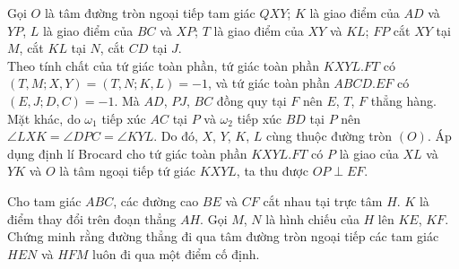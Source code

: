     \begin{solution}
        Gọi \(O\) là tâm đường tròn ngoại tiếp tam giác \(QXY\); \(K\) là giao điểm của \(AD\) và \(YP\), \(L\) là giao điểm của \(BC\) và \(XP\); \(T\) là giao điểm của \(XY\) và \(KL\); \(FP\) cắt \(XY\) tại \(M\), cắt \(KL\) tại \(N\), cắt \(CD\) tại \(J\).\\
        Theo tính chất của tứ giác toàn phần, tứ giác toàn phần \(KXYL.FT\) có \((T,M;X,Y) = (T,N;K,L) = -1\), và tứ giác toàn phần \(ABCD.EF\) có \((E,J;D,C) = -1\). Mà \(AD\), \(PJ\), \(BC\) đồng quy tại \(F\) nên \(E\), \(T\), \(F\) thẳng hàng.\\
        Mặt khác, do \(\omega_1\) tiếp xúc \(AC\) tại \(P\) và \(\omega_2\) tiếp xúc \(BD\) tại \(P\) nên \(\angle LXK = \angle DPC = \angle KYL\). Do đó, \(X\), \(Y\), \(K\), \(L\) cùng thuộc đường tròn \((O)\). Áp dụng định lí Brocard cho tứ giác toàn phần \(KXYL.FT\) có \(P\) là giao của \(XL\) và \(YK\) và \(O\) là tâm ngoại tiếp tứ giác \(KXYL\), ta thu được \(OP \perp EF\).
    \end{solution}

    \begin{problem}
        Cho tam giác \(ABC\), các đường cao \(BE\) và \(CF\) cắt nhau tại trực tâm \(H\). \(K\) là điểm thay đổi trên đoạn thẳng \(AH\). Gọi \(M\), \(N\) là hình chiếu của \(H\) lên \(KE\), \(KF\). Chứng minh rằng đường thẳng đi qua tâm đường tròn ngoại tiếp các tam giác \(HEN\) và \(HFM\) luôn đi qua một điểm cố định.
    \end{problem}

